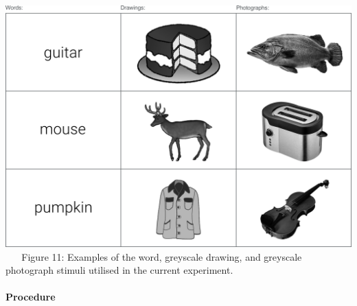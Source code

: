 \documentclass[
  11pt,
]{article}
\begin{document}
~ ~

\includegraphics[width=1\linewidth]{./resources/images/exp3__stim_examples}
~ ~ Figure 11: Examples of the word, greyscale drawing, and greyscale
photograph stimuli utilised in the current experiment. ~ ~

\hypertarget{procedure-2}{%
\paragraph{Procedure}\label{procedure-2}}
\end{document}
